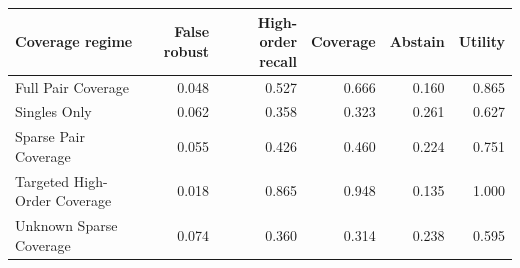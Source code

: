 \begin{tabular}{lrrrrr}
\toprule
Coverage regime & False robust & High-order recall & Coverage & Abstain & Utility \\
\midrule
Full Pair Coverage & 0.048 & 0.527 & 0.666 & 0.160 & 0.865 \\
Singles Only & 0.062 & 0.358 & 0.323 & 0.261 & 0.627 \\
Sparse Pair Coverage & 0.055 & 0.426 & 0.460 & 0.224 & 0.751 \\
Targeted High-Order Coverage & 0.018 & 0.865 & 0.948 & 0.135 & 1.000 \\
Unknown Sparse Coverage & 0.074 & 0.360 & 0.314 & 0.238 & 0.595 \\
\bottomrule
\end{tabular}
